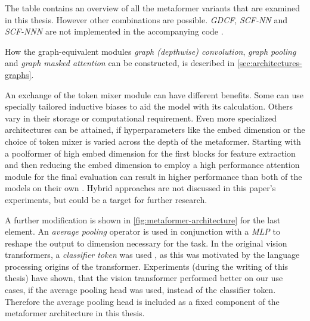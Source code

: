 The table contains an overview of all the metaformer variants that are examined in this thesis.
However other combinations are possible. \emph{GDCF}, \emph{SCF-NN} and \emph{SCF-NNN} are not implemented in the accompanying code \cite{selfPhysics, selfComputerScience}.

How the graph-equivalent modules \emph{graph (depthwise) convolution}, \emph{graph pooling} and \emph{graph masked attention} can be constructed, is described in \autoref{sec:architectures-graphs}.

An exchange of the token mixer module can have different benefits. 
Some can use specially tailored inductive biases to aid the model with its calculation.
Others vary in their storage or computational requirement.
Even more specialized architectures can be attained, if hyperparameters like the embed dimension or the choice of token mixer is varied across the depth of the metaformer. 
Starting with a poolformer of high embed dimension for the first blocks for feature extraction and then reducing the embed dimension to employ a high performance attention module for the final evaluation can result in higher performance than both of the models on their own \cite{metaformerPaper}. 
Hybrid approaches are not discussed in this paper's experiments, but could be a target for further research.

A further modification is shown in \autoref{fig:metaformer-architecture} for the last element.
An \emph{average pooling} operator is used in conjunction with a \emph{MLP} to reshape the output to dimension necessary for the task. 
In the original vision transformers, a \emph{classifier token} was used \cite{dinoPaper}, as this was motivated by the language processing origins of the transformer.
Experiments (during the writing of this thesis) have shown, that the vision transformer performed better on our use cases, if the average pooling head was used, instead of the classifier token. 
Therefore the average pooling head is included as a fixed component of the metaformer architecture in this thesis.
